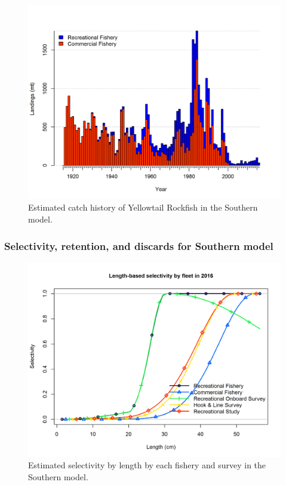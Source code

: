 \documentclass[12pt,]{article}
\begin{document}
\newpage

\begin{figure}[htbp]
\centering
\includegraphics{r4ss/plots_mod2/catch2 landings stacked.png}
\caption{Estimated catch history of Yellowtail Rockfish in the Southern
model. \label{fig:r4ss_catch2_S}}
\end{figure}

\FloatBarrier

\newpage 

\subsubsection{Selectivity, retention, and discards for Southern
model}\label{selectivity-retention-and-discards-for-southern-model}

\begin{figure}[htbp]
\centering
\includegraphics{r4ss/plots_mod2/sel01_multiple_fleets_length1.png}
\caption{Estimated selectivity by length by each fishery and survey in
the Southern model. \label{fig:selex.N}}
\end{figure}
\end{document}
